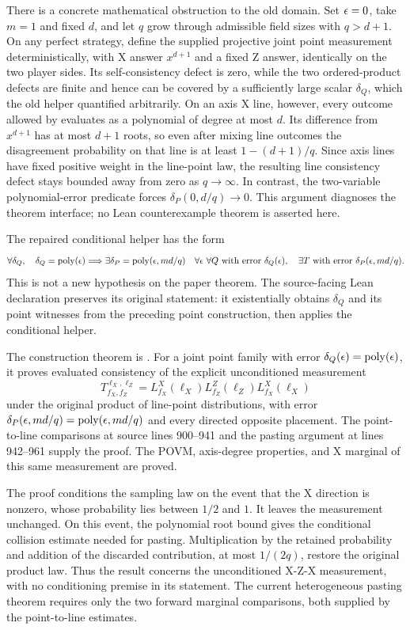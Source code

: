 \documentclass[11pt]{article}
\DeclareMathOperator{\poly}{poly}
\begin{document}
There is a concrete mathematical obstruction to the old domain.  Set
$\epsilon=0$, take $m=1$ and fixed $d$, and let $q$ grow through admissible field
sizes with $q>d+1$.  On any perfect strategy, define the supplied projective
joint point measurement deterministically, with X answer $x^{d+1}$ and a fixed
Z answer, identically on the two player sides.  Its self-consistency defect is
zero, while the two ordered-product defects are finite and hence can be covered
by a sufficiently large scalar $\delta_Q$, which the old helper quantified
arbitrarily.  On an axis X line, however, every outcome allowed by
 evaluates as a polynomial of degree at
most $d$.  Its difference from $x^{d+1}$ has at most $d+1$ roots, so even after
mixing line outcomes the disagreement probability on that line is at least
$1-(d+1)/q$.  Since axis lines have fixed positive weight in the line-point
law, the resulting line consistency defect stays bounded away from zero as
$q\to\infty$.  In contrast, the two-variable polynomial-error predicate forces
$\delta_P(0,d/q)\to0$.  This argument diagnoses the theorem interface; no Lean
counterexample theorem is asserted here.

The repaired conditional helper has the form
\[
  \forall\delta_Q,\quad \delta_Q=\poly(\eps)\Longrightarrow
  \exists\delta_P=\poly(\eps,md/q)\quad
  \forall\eps\ \forall Q\text{ with error }\delta_Q(\eps),\quad
  \exists T\text{ with error }\delta_P(\eps,md/q).
\]
This is not a new hypothesis on the paper theorem.  The source-facing Lean
declaration  preserves its original statement:
it existentially obtains $\delta_Q$ and its point witnesses from the preceding
point construction, then applies the conditional helper.

The construction theorem is
. For a joint point family
with error $\delta_Q(\eps)=\poly(\eps)$, it proves evaluated consistency
of the explicit unconditioned measurement
\[
 T^{\ell_X,\ell_Z}_{f_X,f_Z}
 =L^X_{f_X}(\ell_X)L^Z_{f_Z}(\ell_Z)L^X_{f_X}(\ell_X)
\]
under the original product of line-point distributions, with error
$\delta_P(\eps,md/q)=\poly(\eps,md/q)$ and every directed opposite
placement. The point-to-line comparisons at source lines 900--941 and the
pasting argument at lines 942--961 supply the proof. The POVM,
axis-degree properties, and X marginal of this same measurement are proved.

The proof conditions the sampling law on the event that the X direction
is nonzero, whose probability lies between $1/2$ and $1$. It leaves the
measurement unchanged. On this event, the polynomial root bound gives the
conditional collision estimate needed for pasting. Multiplication by the
retained probability and addition of the discarded contribution, at most
$1/(2q)$, restore the original product law. Thus the result concerns the
unconditioned X-Z-X measurement, with no conditioning premise in its
statement. The current heterogeneous pasting theorem requires only the two
forward marginal comparisons, both supplied by the point-to-line estimates.
\end{document}
